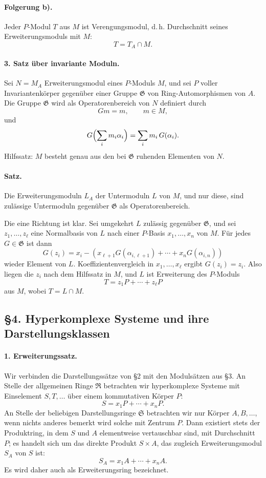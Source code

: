 \documentclass[11pt]{article}
\providecommand{\frR}{\mathfrak R}
\providecommand{\frS}{\mathfrak S}
\providecommand{\frG}{\mathfrak G}
\begin{document}
\paragraph{Folgerung b).}
Jeder \(P\)-Modul \(T\) aus \(M\) ist Verengungsmodul, d.\,h. Durchschnitt seines Erweiterungsmoduls mit \(M\):
\[
        T=T_A\cap M .
\]

\paragraph{3. Satz über invariante Moduln.}
Sei \(N=M_A\) Erweiterungsmodul eines \(P\)-Moduls \(M\), und sei \(P\) voller Invariantenkörper gegenüber einer Gruppe \(\frG\) von Ring-Automorphismen von \(A\). Die Gruppe \(\frG\) wird als Operatorenbereich von \(N\) definiert durch
\[
        Gm=m,\qquad m\in M,
\]
und
\[
        G\Bigl(\sum_i m_i\alpha_i\Bigr)=\sum_i m_i\,G(\alpha_i).
\]
Hilfssatz: \(M\) besteht genau aus den bei \(\frG\) ruhenden Elementen von \(N\).

\paragraph{Satz.}
Die Erweiterungsmoduln \(L_A\) der Untermoduln \(L\) von \(M\), und nur diese, sind zulässige Untermoduln gegenüber \(\frG\) als Operatorenbereich.

Die eine Richtung ist klar. Sei umgekehrt \(L\) zulässig gegenüber \(\frG\), und sei \(z_1,\ldots,z_\ell\) eine Normalbasis von \(L\) nach einer \(P\)-Basis \(x_1,\ldots,x_n\) von \(M\). Für jedes \(G\in\frG\) ist dann
\[
        G(z_i)=x_i-(x_{\ell+1}G(\alpha_{i,\ell+1})+\cdots+x_nG(\alpha_{i,n}))
\]
wieder Element von \(L\). Koeffizientenvergleich in \(x_1,\ldots,x_\ell\) ergibt \(G(z_i)=z_i\). Also liegen die \(z_i\) nach dem Hilfssatz in \(M\), und \(L\) ist Erweiterung des \(P\)-Moduls
\[
        T=z_1P+\cdots+z_\ell P
\]
aus \(M\), wobei \(T=L\cap M\).

\subsection*{§4. Hyperkomplexe Systeme und ihre Darstellungsklassen}

\paragraph{1. Erweiterungssatz.}
Wir verbinden die Darstellungssätze von §2 mit den Modulsätzen aus §3. An Stelle der allgemeinen Ringe \(\frR\) betrachten wir hyperkomplexe Systeme mit Einselement \(S,T,\ldots\) über einem kommutativen Körper \(P\):
\[
        S=x_1P+\cdots+x_nP.
\]
An Stelle der beliebigen Darstellungsringe \(\frS\) betrachten wir nur Körper \(A,B,\ldots\), wenn nichts anderes bemerkt wird solche mit Zentrum \(P\). Dann existiert stets der Produktring, in dem \(S\) und \(A\) elementweise vertauschbar sind, mit Durchschnitt \(P\); es handelt sich um das direkte Produkt \(S\times A\), das zugleich Erweiterungsmodul \(S_A\) von \(S\) ist:
\[
        S_A=x_1A+\cdots+x_nA.
\]
Es wird daher auch als Erweiterungsring bezeichnet.
\end{document}
